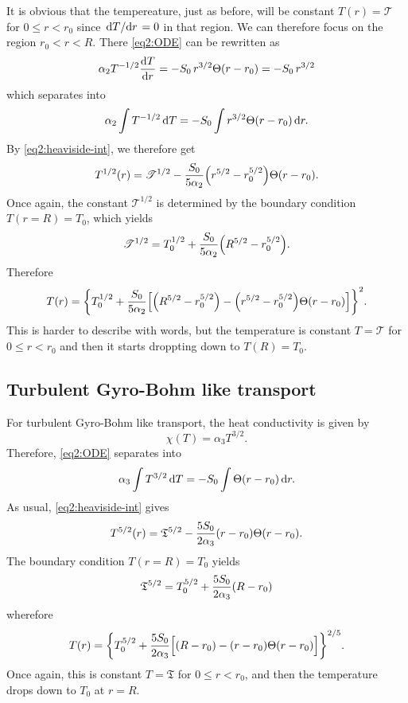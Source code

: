\documentclass[11pt,a4paper, 
swedish, english %
]{article}
\begin{document}
It is obvious that the tempereature, just as before, will be constant
$T(r)=\mathscr{T}$ for $0\le r<r_0$ since $\dv*{T}{r}=0$ in that region. We
can therefore focus on the region $r_0<r<R$. There \eqref{eq2:ODE} can
be rewritten as 
\begin{equation}
\alpha_2T^{-1/2}\dv{T}{r}=-S_0\,r^{3/2}\Theta(r-r_0)=-S_0\,r^{3/2}
\end{equation}
which separates into
\begin{equation}
\alpha_2\int T^{-1/2}\id{T}=-S_0\int r^{3/2}\Theta(r-r_0) \id{r}.
\end{equation}
By \eqref{eq2:heaviside-int}, we therefore get
\begin{equation}
T^{1/2}(r)=\mathscr{T}^{1/2}
-\frac{S_0}{5\alpha_2}\qty(r^{5/2}-r_0^{5/2})\Theta(r-r_0).
\end{equation}
Once again, the constant $\mathscr{T}^{1/2}$ is determined by the boundary
condition $T(r=R)=T_0$, which yields
\begin{equation}
\mathscr{T}^{1/2}=T_0^{1/2}+
\frac{S_0}{5\alpha_2}\qty(R^{5/2}-r_0^{5/2}).
\end{equation}
Therefore
\begin{equation}
T(r)=\qty{T_0^{1/2}+\frac{S_0}{5\alpha_2}
\qty[\qty(R^{5/2}-r_0^{5/2})-\qty(r^{5/2}-r_0^{5/2})\Theta(r-r_0)]}^2.
\end{equation}
This is harder to describe with words, but the temperature is constant
$T=\mathscr{T}$ for $0\le r<r_0$ and then it starts droppting down to
$T(R)=T_0$. 

\subsection{Turbulent Gyro-Bohm like transport}
For turbulent Gyro-Bohm like transport, the heat conductivity is given
by
\begin{equation}
\chi(T)=\alpha_3 T^{3/2}.
\end{equation}
Therefore, \eqref{eq2:ODE} separates into
\begin{equation}
\alpha_3\int T^{3/2}\id{T}=-S_0\int \Theta(r-r_0) \id{r}.
\end{equation}
As usual, \eqref{eq2:heaviside-int} gives
\begin{equation}
T^{5/2}(r)=\mathfrak{T}^{5/2}
-\frac{5S_0}{2\alpha_3}\qty(r-r_0)\Theta(r-r_0).
\end{equation}
The boundary condition $T(r=R)=T_0$ yields
\begin{equation}
\mathfrak{T}^{5/2}=T_0^{5/2}+
\frac{5S_0}{2\alpha_3}\qty(R-r_0)
\end{equation}
wherefore
\begin{equation}
T(r)=\qty{T_0^{5/2}+\frac{5S_0}{2\alpha_3}
\Big[(R-r_0)-(r-r_0)\Theta(r-r_0)\Big]}^{2/5}.
\end{equation}
Once again, this is constant $T=\mathfrak{T}$ for $0\le r<r_0$, and
then the temperature drops down to $T_0$ at $r=R$.
\end{document}
